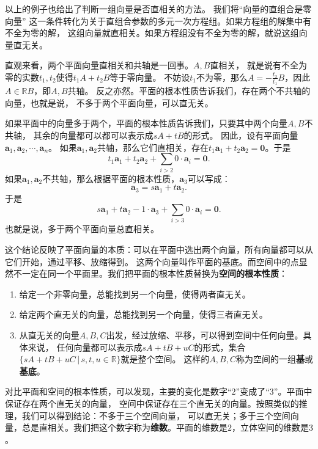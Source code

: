 \documentclass[12pt,UTF8]{ctexbook}
\begin{document}
以上的例子也给出了判断一组向量是否直相关的方法。
我们将“向量的直组合是零向量”
这一条件转化为关于直组合参数的多元一次方程组。如果方程组的解集中有不全为零的解，
这组向量就直相关。如果方程组没有不全为零的解，就说这组向量直无关。

直观来看，两个平面向量直相关和共轴是一回事。$A, B$直相关，
就是说有不全为零的实数$t_1,t_2$使得$t_1A + t_2B$等于零向量。
不妨设$t_1$不为零，那么$A = -\frac{t_2}{t_1}B$，因此$A\in\mathbb{R}B$，即$A, B$共轴。
反之亦然。平面的根本性质告诉我们，存在两个不共轴的向量，也就是说，
不多于两个平面向量，可以直无关。

如果平面中的向量多于两个，平面的根本性质告诉我们，只要其中两个向量$A, B$不共轴，
其余的向量都可以都可以表示成$sA + tB$的形式。
因此，设有平面向量$\mathbf{a}_1, \mathbf{a}_2, \cdots , \mathbf{a}_n$。
如果$\mathbf{a}_1, \mathbf{a}_2$共轴，那么它们直相关，存在$t_1\mathbf{a}_1 + t_2\mathbf{a}_2 = \mathbf{0}$。于是
$$t_1\mathbf{a}_1 + t_2\mathbf{a}_2 + \sum_{i>2}0\cdot\mathbf{a}_i = \mathbf{0}.$$
如果$\mathbf{a}_1, \mathbf{a}_2$不共轴，那么根据平面的根本性质，$\mathbf{a}_3$可以写成：
$$ \mathbf{a}_3 = s\mathbf{a}_1 + t\mathbf{a}_2.$$
于是
$$s\mathbf{a}_1 + t\mathbf{a}_2 - 1\cdot\mathbf{a}_3 + \sum_{i>3}0\cdot\mathbf{a}_i = \mathbf{0}.$$
也就是说，多于两个平面向量总直相关。

这个结论反映了平面向量的本质：可以在平面中选出两个向量，所有向量都可以从它们开始，通过平移、放缩得到。
这两个向量叫作平面的基底。而空间中的点显然不一定在同一个平面里。我们把平面的根本性质替换为\textbf{空间的根本性质}：

\begin{enumerate}
    \item 给定一个非零向量，总能找到另一个向量，使得两者直无关。
    \item 给定两个直无关的向量，总能找到另一个向量，使得三者直无关。
    \item 从直无关的向量$A, B, C$出发，经过放缩、平移，可以得到空间中任何向量。具体来说，
    任何向量都可以表示成$sA + tB + uC$的形式，集合$\{sA + tB + uC \, | \, s, t, u \in\mathbb{R}\}$就是整个空间。
    这样的$A, B, C$称为空间的一组\textbf{基}或\textbf{基底}。
\end{enumerate}

对比平面和空间的根本性质，可以发现，主要的变化是数字“$2$”变成了“$3$”。平面中保证存在两个直无关的向量，
空间中保证存在三个直无关的向量。按照类似的推理，我们可以得到结论：不多于三个空间向量，
可以直无关；多于三个空间向量，总是直相关。我们把这个数字称为\textbf{维数}。平面的维数是$2$，立体空间的维数是$3$。
\end{document}
